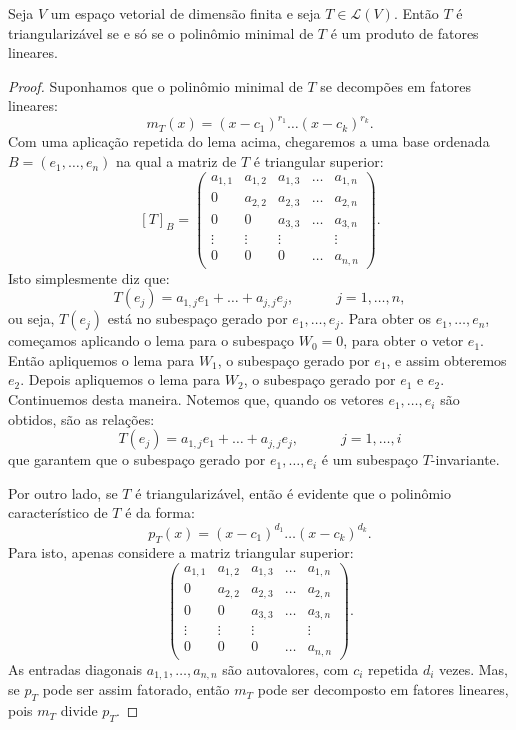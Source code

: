 \documentclass[11pt,twoside,a4paper]{book}
\begin{document}
\begin{teorema}
Seja $V$ um espaço vetorial de dimensão finita e seja $T\in\mathcal{L}(V)$. Então $T$ é triangularizável se e só se o polinômio minimal de $T$ é um produto de fatores lineares.
\end{teorema}
\begin{proof}
Suponhamos que o polinômio minimal de $T$ se decompões em fatores lineares:
\[
m_T(x)=(x-c_1)^{r_1}\dots(x-c_k)^{r_k}.
\]
Com uma aplicação repetida do lema acima, chegaremos a uma base ordenada $B=(e_1,\dots,e_n)$ na qual a matriz de $T$ é triangular superior:
\[
[T]_B=\begin{pmatrix}
a_{1,1}&a_{1,2}&a_{1,3}&\ldots&a_{1,n}\\0&a_{2,2}&a_{2,3}&\ldots&a_{2,n}\\0&0&a_{3,3}&\ldots&a_{3,n}\\\vdots&\vdots&\vdots&&\vdots\\0&0&0&\ldots&a_{n,n}
\end{pmatrix}.
\]
Isto simplesmente diz que:
\[
T(e_j)=a_{1,j}e_1+\dots+a_{j,j}e_j,\quad\quad\quad j=1,\dots,n,
\]
ou seja, $T(e_j)$ está no subespaço gerado por $e_1,\dots,e_j$. Para obter os $e_1,\dots,e_n$, começamos aplicando o lema para o subespaço $W_0=0$, para obter o vetor $e_1$. Então apliquemos o lema para $W_1$, o subespaço gerado por $e_1$, e assim obteremos $e_2$. Depois apliquemos o lema para $W_2$, o subespaço gerado por $e_1$ e $e_2$. Continuemos desta maneira. Notemos que, quando os vetores $e_1,\dots,e_i$ são obtidos, são as relações:
\[
T(e_j)=a_{1,j}e_1+\dots+a_{j,j}e_j,\quad\quad\quad j=1,\dots,i
\]
que garantem que o subespaço gerado por $e_1,\dots,e_i$ é um subespaço $T$-invariante.

\medskip
\noindent
Por outro lado, se $T$ é triangularizável, então é evidente que o polinômio característico de $T$ é da forma:
\[
p_T(x)=(x-c_1)^{d_1}\dots(x-c_k)^{d_k}.
\]
Para isto, apenas considere a matriz triangular superior:
\[
\begin{pmatrix}
a_{1,1}&a_{1,2}&a_{1,3}&\ldots&a_{1,n}\\0&a_{2,2}&a_{2,3}&\ldots&a_{2,n}\\0&0&a_{3,3}&\ldots&a_{3,n}\\\vdots&\vdots&\vdots&&\vdots\\0&0&0&\ldots&a_{n,n}
\end{pmatrix}.
\]
As entradas diagonais $a_{1,1},\dots,a_{n,n}$ são autovalores, com $c_i$ repetida $d_i$ vezes. Mas, se $p_T$ pode ser assim fatorado, então $m_T$ pode ser decomposto em fatores lineares, pois $m_T$ divide $p_T$.
\end{proof}
\end{document}
